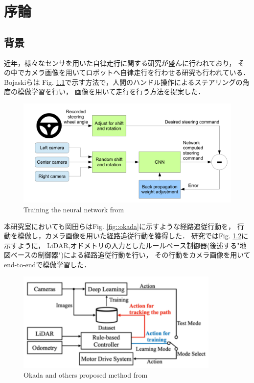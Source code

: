 \chapter{序論}
\section{背景}
近年，様々なセンサを用いた自律走行に関する研究が盛んに行われており，
その中でカメラ画像を用いてロボットへ自律走行を行わせる研究も行われている．
Bojaskiら\cite{Nvidia}は
Fig. \ref{fig::nvidia}で示す方法で，人間のハンドル操作によるステアリングの角度の模倣学習を行い，
画像を用いて走行を行う方法を提案した．

\begin{figure}[h]
    \centering
    \includegraphics[width = 13cm]{./figs/EndtoEnd_Learning_for_Self-Driving_Cars.pdf}
    \caption{Training the neural network from \cite{Nvidia}}
    \label{fig::nvidia}
\end{figure}

\newpage
本研究室においても岡田ら\cite{okada}はFig. \ref{fig::okada}に示すような経路追従行動を，
行動を模倣し，カメラ画像を用いた経路追従行動を獲得した．
研究ではFig. \ref{fig::okada_sys}に示すように，
LiDAR,オドメトリの入力としたルールベース制御器(後述する"地図べースの制御器")による経路追従行動を行い，
その行動をカメラ画像を用いてend-to-endで模倣学習した．
\begin{figure}[h]
    \centering
    \includegraphics[width = 10cm]{./figs/okada_sys.pdf}
    \caption{Okada and others proposed method from \cite{okada}}
    \label{fig::okada_sys}
\end{figure}

